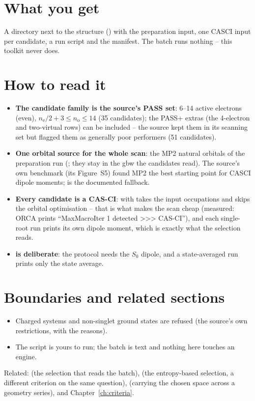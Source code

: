 \section{What you get}

A directory next to the structure () with the
preparation input, one CASCI input per candidate, a run script and the
manifest.  The batch runs nothing -- this toolkit never does.

\section{How to read it}

\begin{readbox}
\begin{itemize}
  \item \textbf{The candidate family is the source's PASS set}: 6--14 active
    electrons (even), $n_\mathrm{e}/2 + 3 \le n_\mathrm{o} \le 14$ (35
    candidates); the PASS+ extras (the 4-electron and two-virtual rows) can be
    included -- the source kept them in its scanning set but flagged them as
    generally poor performers (51 candidates).
  \item \textbf{One orbital source for the whole scan}: the MP2 natural
    orbitals of the preparation run (; they stay in the
    gbw the candidates read).  The source's own benchmark (its Figure~S5)
    found MP2 the best starting point for CASCI dipole moments;  is
    the documented fallback.
  \item \textbf{Every candidate is a CAS-CI}:  with
     takes the input occupations and skips the orbital
    optimisation -- that is what makes the scan cheap (measured: ORCA prints
    ``MaxMacroIter 1 detected >>> CAS-CI''), and each single-root run prints
    its own dipole moment, which is exactly what the selection reads.
  \item \textbf{ is deliberate}: the protocol needs the
    $S_0$ dipole, and a state-averaged run prints only the state average.
\end{itemize}
\end{readbox}

\section{Boundaries and related sections}

\begin{refusalbox}
\begin{itemize}
  \item Charged systems and non-singlet ground states are refused (the
    source's own restrictions, with the reasons).
  \item The script is yours to run; the batch is text and nothing here
    touches an engine.
\end{itemize}
\end{refusalbox}

Related:  (the selection that reads the batch),  (the
entropy-based selection, a different criterion on the same question),
 (carrying the chosen space across a geometry series), and
Chapter~\ref{ch:criteria}.
